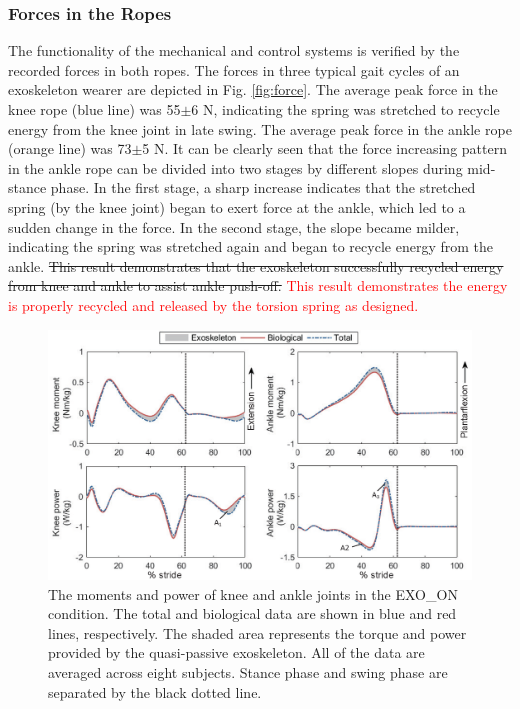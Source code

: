 \documentclass[twocolumn,cleanfoot,10pt]{asme2ej}
\begin{document}
\subsubsection{Forces in the Ropes}
The functionality of the mechanical and control systems is verified by the recorded forces in both ropes.
The forces in three typical gait cycles of an exoskeleton wearer are depicted in Fig. \ref{fig:force}.
The average peak force in the knee rope (blue line) was 55$\pm$6 N, indicating the spring was stretched to recycle energy from the knee joint in late swing.
The average peak force in the ankle rope (orange line) was 73$\pm$5 N.
It can be clearly seen that the force increasing pattern in the ankle rope can be divided into two stages by different slopes during mid-stance phase.
In the first stage, a sharp increase indicates that the stretched spring (by the knee joint) began to exert force at the ankle, which led to a sudden change in the force.
In the second stage, the slope became milder, indicating the spring was stretched again and began to recycle energy from the ankle.
\sout{This result demonstrates that the exoskeleton successfully recycled energy from knee and ankle to assist ankle push-off.}
\textcolor{red}{This result demonstrates the energy is properly recycled and released by the torsion spring as designed.}

\begin{figure}[t]
	\centering
	\includegraphics[width=17cm]{exo.eps}
	\caption{The moments and power of knee and ankle joints in the EXO\_ON condition.
	The total and biological data are shown in blue and red lines, respectively.
	The shaded area represents the torque and power provided by the quasi-passive exoskeleton.
	All of the data are averaged across eight subjects.
	Stance phase and swing phase are separated by the black dotted line.}
	\label{fig:exo}
\end{figure}
\end{document}
